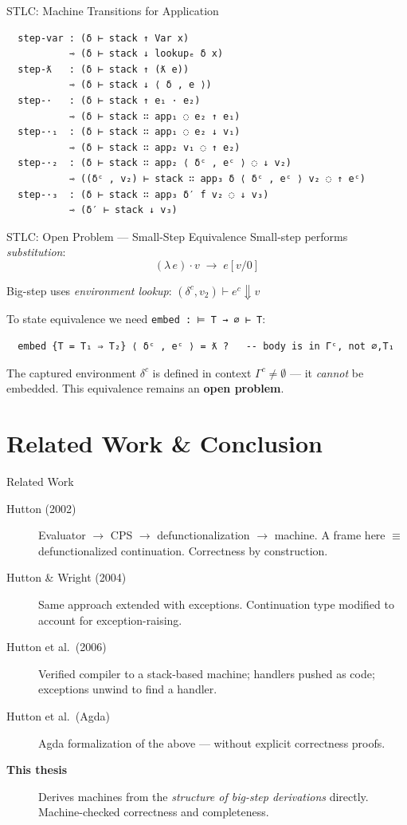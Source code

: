 \documentclass[10pt,compress,aspectratio=169]{beamer}
\begin{document}
\begin{frame}[fragile]{STLC: Machine Transitions for Application}
\begin{verbatim}
  step-var : (δ ⊢ stack ↑ Var x)
           ⇾ (δ ⊢ stack ↓ lookupₑ δ x)
  step-ƛ   : (δ ⊢ stack ↑ (ƛ e))
           ⇾ (δ ⊢ stack ↓ ⟨ δ , e ⟩)
  step-·   : (δ ⊢ stack ↑ e₁ · e₂)
           ⇾ (δ ⊢ stack ∷ app₁ ◌ e₂ ↑ e₁)
  step-·₁  : (δ ⊢ stack ∷ app₁ ◌ e₂ ↓ v₁)
           ⇾ (δ ⊢ stack ∷ app₂ v₁ ◌ ↑ e₂)
  step-·₂  : (δ ⊢ stack ∷ app₂ ⟨ δᶜ , eᶜ ⟩ ◌ ↓ v₂)
           ⇾ ((δᶜ , v₂) ⊢ stack ∷ app₃ δ ⟨ δᶜ , eᶜ ⟩ v₂ ◌ ↑ eᶜ)
  step-·₃  : (δ ⊢ stack ∷ app₃ δ′ f v₂ ◌ ↓ v₃)
           ⇾ (δ′ ⊢ stack ↓ v₃)
\end{verbatim}
\end{frame}

\begin{frame}[fragile]{STLC: Open Problem — Small-Step Equivalence}
  Small-step performs \emph{substitution}:
  \[ (\lambda\,e) \cdot v \;\longrightarrow\; e[v/0] \]

  Big-step uses \emph{environment lookup}:
  $(\delta^c, v_2) \vdash e^c \Downarrow v$

  \bigskip
  To state equivalence we need \texttt{embed : ⊨ T → ∅ ⊢ T}:
\begin{verbatim}
  embed {T = T₁ ⇒ T₂} ⟨ δᶜ , eᶜ ⟩ = ƛ ?   -- body is in Γᶜ, not ∅,T₁
\end{verbatim}

  The captured environment $\delta^c$ is defined in context $\Gamma^c \neq \emptyset$ — it \emph{cannot} be embedded. This equivalence remains an \textbf{open problem}.
\end{frame}

\section{Related Work \& Conclusion}

\begin{frame}{Related Work}
  \begin{description}
    \item[Hutton (2002)] Evaluator $\to$ CPS $\to$ defunctionalization $\to$ machine.
      A frame here $\equiv$ defunctionalized continuation. Correctness by construction.
    \item[Hutton \& Wright (2004)] Same approach extended with exceptions. Continuation type modified to account for exception-raising.
    \item[Hutton et al.\ (2006)] Verified compiler to a stack-based machine; handlers pushed as code; exceptions unwind to find a handler.
    \item[Hutton et al.\ (Agda)] Agda formalization of the above — without explicit correctness proofs.
    \bigskip
    \item[\textbf{This thesis}] Derives machines from the \emph{structure of big-step derivations} directly. Machine-checked correctness and completeness.
  \end{description}
\end{frame}
\end{document}
